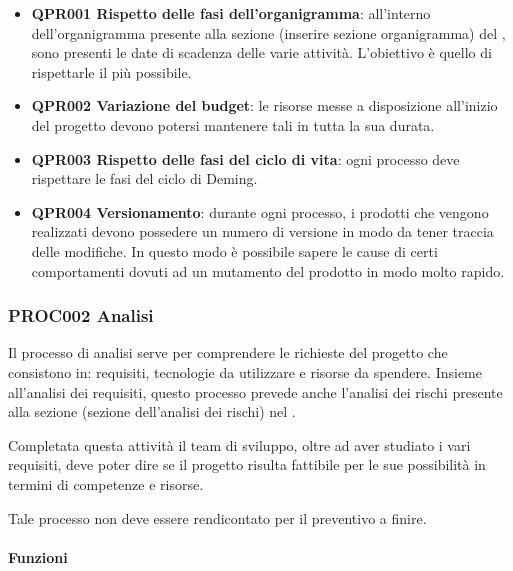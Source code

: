 		\begin{itemize} 
			\item \textbf{QPR001 Rispetto delle fasi dell'organigramma}: all'interno dell'organigramma presente alla sezione (inserire sezione organigramma) del \Doc{\PdPv}, sono presenti le date di scadenza delle varie attività. L'obiettivo è quello di rispettarle il più possibile.
			\item \textbf{QPR002 Variazione del budget}: le risorse messe a disposizione all'inizio del progetto devono potersi mantenere tali in tutta la sua durata.
			\item \textbf{QPR003 Rispetto delle fasi del ciclo di vita}: ogni processo deve rispettare le fasi del ciclo di Deming.
			\item \textbf{QPR004 Versionamento}: durante ogni processo, i prodotti che vengono realizzati devono possedere un numero di versione in modo da tener traccia delle modifiche. In questo modo è possibile sapere le cause di certi comportamenti dovuti ad un mutamento del prodotto in modo molto rapido.  
		\end{itemize}
	
	\subsubsection{PROC002 Analisi}
	Il processo di analisi serve per comprendere le richieste del progetto che consistono in: requisiti, tecnologie da utilizzare e risorse da spendere. Insieme all'analisi dei requisiti, questo processo prevede anche l'analisi dei rischi presente alla sezione (sezione dell'analisi dei rischi) nel \PdPv.
	
	Completata questa attività il team di sviluppo, oltre ad aver studiato i vari requisiti, deve poter dire se il progetto risulta fattibile per le sue possibilità in termini di competenze e risorse.
	
	Tale processo non deve essere rendicontato per il preventivo a finire.
	
		\paragraph*{Funzioni}
		
